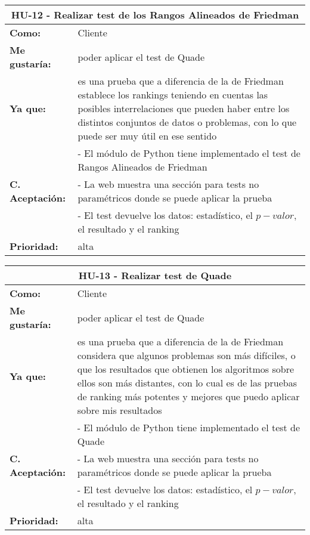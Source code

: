 
\begin{table}[H]
	\begin{tabular}{| p{3cm}| p{12cm} |}
		\hline
		\multicolumn{2}{|c|}{\textbf{HU-12} - Realizar test de los Rangos Alineados de Friedman} \\ \hline
		\textbf{Como:} & Cliente \\ \hline
		\textbf{Me gustaría:} & poder aplicar el test de Quade \\ \hline
		\textbf{Ya que:} & es una prueba que a diferencia de la de Friedman establece los rankings teniendo en cuentas las posibles interrelaciones que pueden haber entre los distintos conjuntos de datos o problemas, con lo que puede ser muy útil en ese sentido \\ \hline
		\multirow{3}{12cm}{\textbf{C. Aceptación:}} & - El módulo de Python tiene implementado el test de Rangos Alineados de Friedman \\
		& - La web muestra una sección para tests no paramétricos donde se puede aplicar la prueba \\
		& - El test devuelve los datos: estadístico, el $p-valor$, el resultado y el ranking \\ \hline
		\textbf{\textbf{Prioridad:}} & alta \\ \hline
	\end{tabular}
\end{table}


\begin{table}[H]
	\begin{tabular}{| p{3cm}| p{12cm} |}
		\hline
		\multicolumn{2}{|c|}{\textbf{HU-13} - Realizar test de Quade} \\ \hline
		\textbf{Como:} & Cliente \\ \hline
		\textbf{Me gustaría:} & poder aplicar el test de Quade \\ \hline
		\textbf{Ya que:} & es una prueba que a diferencia de la de Friedman considera que algunos problemas son más difíciles, o que los resultados que obtienen los algoritmos sobre ellos son más distantes, con lo cual es de las pruebas de ranking más potentes y mejores que puedo aplicar sobre mis resultados \\ \hline
		\multirow{3}{12cm}{\textbf{C. Aceptación:}} & - El módulo de Python tiene implementado el test de Quade \\
		& - La web muestra una sección para tests no paramétricos donde se puede aplicar la prueba \\
		& - El test devuelve los datos: estadístico, el $p-valor$, el resultado y el ranking \\ \hline
		\textbf{\textbf{Prioridad:}} & alta \\ \hline
	\end{tabular}
\end{table}


